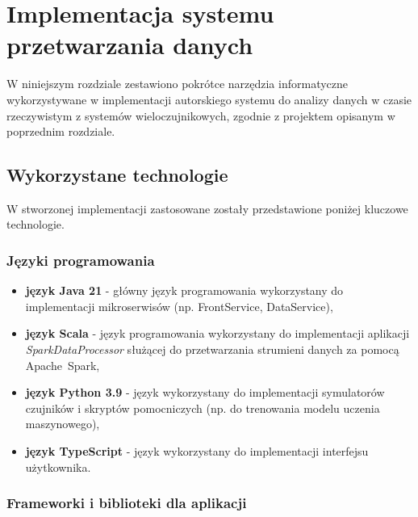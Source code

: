 \section{Implementacja systemu przetwarzania danych}
\label{sec:implementacja_systemu}

W niniejszym rozdziale zestawiono pokrótce narzędzia informatyczne wykorzystywane w implementacji autorskiego systemu do analizy danych w czasie rzeczywistym z systemów wieloczujnikowych,
zgodnie z projektem opisanym w poprzednim rozdziale.

\subsection{Wykorzystane technologie}
\label{subsec:technologie}

W stworzonej implementacji zastosowane zostały przedstawione poniżej kluczowe technologie.

\subsubsection{Języki programowania}
\label{subsubsec:jezyki_programowania}

\begin{itemize}
    \item \textbf{język Java 21} - główny język programowania wykorzystany do implementacji mikroserwisów (np. FrontService, DataService),
    \item \textbf{język Scala} - język programowania wykorzystany do implementacji aplikacji \\ \textit{\mbox{SparkDataProcessor}} służącej do przetwarzania strumieni danych za pomocą \mbox{Apache Spark},
    \item \textbf{język Python 3.9} - język wykorzystany do implementacji symulatorów czujników i skryptów pomocniczych (np. do trenowania modelu uczenia maszynowego),
    \item \textbf{język TypeScript} - język wykorzystany do implementacji interfejsu użytkownika.
\end{itemize}

\subsubsection{Frameworki i biblioteki dla aplikacji}
\label{subsubsec:frameworki}

